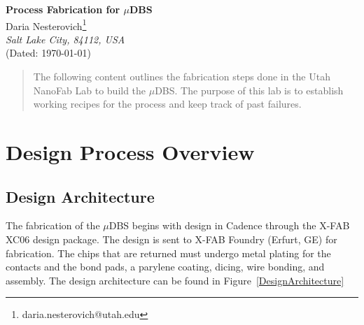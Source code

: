 \documentclass[12pt]{article}
\numberwithin{equation}{section}
\numberwithin{table}{section}
\numberwithin{figure}{section}
\begin{document}

\thispagestyle{fancy}

\begin{center}
\textbf{\Large Process Fabrication for $\mu$DBS} \\[20pt]
  Daria Nesterovich\footnote{daria.nesterovich@utah.edu}\\[2pt] \emph{Salt Lake City, 84112, USA}  \\[6pt]
  (Dated: \today)
\end{center}

\vspace{6pt}


\begin{abstract}
The following content outlines the fabrication steps done in the Utah NanoFab Lab to build the $\mu$DBS. The purpose of this lab is to establish working recipes for the process and keep track of past failures.
\end{abstract}

\section{Design Process Overview}

\subsection{Design Architecture}

The fabrication of the $\mu$DBS begins with design in Cadence through the X-FAB XC06 design package. The design is sent to X-FAB Foundry (Erfurt, GE) for fabrication. The chips that are returned must undergo metal plating for the contacts and the bond pads, a parylene coating, dicing, wire bonding, and assembly. The design architecture can be found in Figure~\ref{DesignArchitecture}
\end{document}
